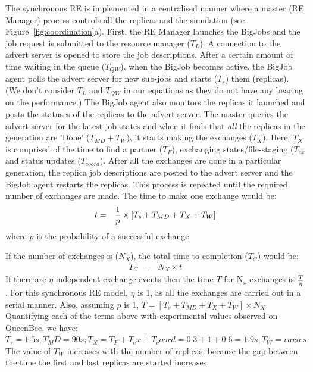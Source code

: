 \documentclass{rspublic}
\begin{document}
The synchronous RE is implemented in a centralised manner where a master (RE Manager) process controls all the replicas and the simulation (see Figure~\ref{fig:coordination}a). First, the RE Manager launches the BigJobs and the job request is submitted to the resource manager ($T_{L}$). A connection to the advert server is opened to store the job descriptions. %
After a certain amount of time waiting in the queue ($T_{QW}$), when the BigJob becomes active, 
the BigJob agent polls the advert server for new sub-jobs 
and starts ($T_{s}$) them (replicas). (We don't consider  $T_{L}$ and $T_{QW}$ in our equations as they do not have any bearing on the performance.) The BigJob agent also monitors the 
replicas it launched and posts the statuses of the replicas to the advert 
server. The master queries the advert server for the latest job 
states and when it finds that \emph{all} the replicas in the generation are 'Done' ($T_{MD}+T_{W}$), it 
starts making the exchanges ($T_{X}$). Here, $T_{X}$ is comprised of the time to find a partner ($T_{F}$), exchanging states/file-staging ($T_{ex}$ and status updates ($T_{coord}$). 
After all the exchanges are done in a particular generation, the replica job descriptions 
are posted to the advert server and the BigJob agent restarts the 
replicas. This process is repeated until the required number of 
exchanges are made. The time to make one exchange would be:
\begin{eqnarray}
t &=&  {1 \over p} \times {[T_s+T_{MD} + T_{X} + T_{W}]} 
\label{eq:sy}
\end{eqnarray}
where $p$ is the probability of a successful exchange.

If the number of exchanges is ($N_{X}$), the total time to completion ($T_{C}$) would be:
\begin{eqnarray}
T_{C} &=& N_{X} \times t 
\label{eq:synch}
\end{eqnarray}
If there are $\eta$ independent exchange events then the time $T$ for 
N$_x$ exchanges is $T \over \eta$. For this synchronous RE model, $\eta$ is 1, as all the exchanges are carried out in a serial manner. Also, assuming $p$ is 1, $T =  [T_s+T_{MD} + T_{X} + T_{W}] \times N_{X}$
Quantifying each of the terms above with experimental values observed on QueenBee, we have:
$T_s = 1.5 s; T_MD=90 s; T_X=T_F+T_ex+T_coord=0.3+1+0.6=1.9 s; T_W=varies.$ 
The value of $T_W$ increases with the number of replicas, because the gap between the time the first and last replicas are started increases. 
\end{document}
